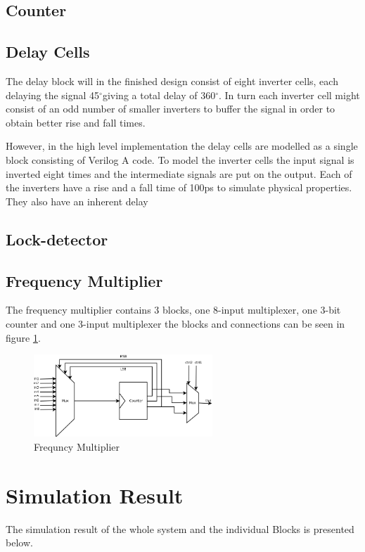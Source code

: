 \documentclass[a4paper,12pt]{article} \usepackage{graphicx}
\newcommand{\degree}{\ensuremath{^\circ}}
\begin{document}
\subsection{Counter}
\subsection{Delay Cells}

The delay block will in the finished design consist of eight inverter cells,
each delaying the signal 45\degree giving a total delay of 360\degree. In turn
each inverter cell might consist of an odd number of smaller inverters to buffer
the signal in order to obtain better rise and fall times.

However, in the high level implementation the delay cells are modelled
as a single block consisting of Verilog A code. To model the inverter
cells the input signal is inverted eight times and the intermediate
signals are put on the output. Each of the inverters have a rise and a
fall time of 100ps to simulate physical properties. They also have an
inherent delay 


\subsection{Lock-detector}
\subsection{Frequency Multiplier}
The frequency multiplier contains 3 blocks, one 8-input multiplexer, one 3-bit
counter and one 3-input multiplexer the blocks and connections can be seen in 
figure \ref{fig:freq_mult}.
\begin{figure}[hb!]
        \centering
        \includegraphics[width=0.6\textwidth]{../Bilder/freq_mult_high.png}
        \caption{Frequncy Multiplier}
        \label{fig:freq_mult}
\end{figure}

\section{Simulation Result}
The simulation result of the whole system and the individual Blocks is
presented below.
\end{document}
